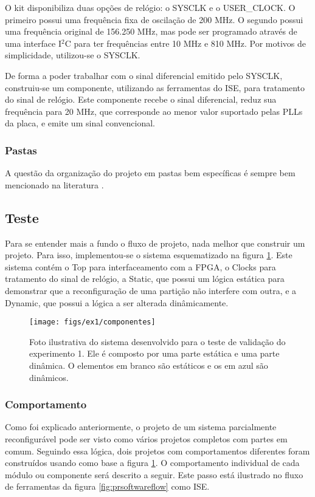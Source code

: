 \documentclass[11pt,a4paper,oneside]{book}
\begin{document}
O kit disponibiliza duas opções de relógio: o SYSCLK e o USER\_CLOCK.
O primeiro possui uma frequência fixa de oscilação de 200 MHz.
O segundo possui uma frequência original de 156.250 MHz, mas pode ser programado através de uma interface I$^2$C para ter frequências entre 10 MHz e 810 MHz.
Por motivos de simplicidade, utilizou-se o SYSCLK.

De forma a poder trabalhar com o sinal diferencial emitido pelo SYSCLK, construiu-se um componente, utilizando as ferramentas do ISE, para tratamento do sinal de relógio.
Este componente recebe o sinal diferencial, reduz sua frequência para 20 MHz, que corresponde ao menor valor suportado pelas PLLs da placa, e emite um sinal convencional.

\subsubsection{Pastas}
A questão da organização do projeto em pastas bem específicas é sempre bem mencionado na literatura \cite{ug702, ug743, ug744}.

\subsection{Teste}
Para se entender mais a fundo o fluxo de projeto, nada melhor que construir um projeto.
Para isso, implementou-se o sistema esquematizado na figura \ref{fig:ex1:componentes}.
Este sistema contém o \dlq{}Top\drq{} para interfaceamento com a FPGA, o \dlq{}Clocks\drq{} para tratamento do sinal de relógio, a \dlq{}Static\drq{}, que possui um lógica estática para demonstrar que a reconfiguração de uma partição não interfere com outra, e a \dlq{}Dynamic\drq{}, que possui a lógica a ser alterada dinâmicamente.

\begin{figure}[h]
\centering
\texttt{[image: figs/ex1/componentes]}
\caption{Foto ilustrativa do sistema desenvolvido para o teste de validação do experimento 1. Ele é composto por uma parte estática e uma parte dinâmica. O elementos em branco são estáticos e os em azul são dinâmicos.}
\label{fig:ex1:componentes}
\end{figure}

\subsubsection{Comportamento}
Como foi explicado anteriormente, o projeto de um sistema parcialmente reconfigurável pode ser visto como vários projetos completos com partes em comum.
Seguindo essa lógica, dois projetos com comportamentos diferentes foram construídos usando como base a figura \ref{fig:ex1:componentes}.
O comportamento individual de cada módulo ou componente será descrito a seguir.
Este passo está ilustrado no fluxo de ferramentas da figura \ref{fig:prsoftwareflow} como ISE.
\end{document}
